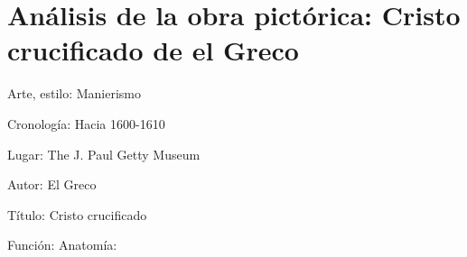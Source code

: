 \section{Análisis de la obra pictórica: Cristo crucificado de el Greco}

Arte, estilo: Manierismo

Cronología: Hacia 1600-1610

Lugar: The J. Paul Getty Museum

Autor: El Greco

Título: Cristo crucificado 

Función:
Anatomía: